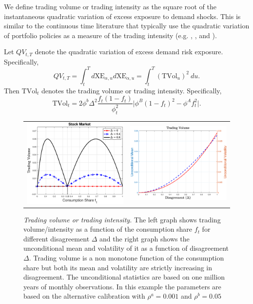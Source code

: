 We define trading volume or trading intensity as the square root of the instantaneous quadratic variation of excess exposure to demand shocks. This is similar to the continuous time literature that typically use the quadratic variation of portfolio policies as a measure of the trading intensity (e.g. , , and ).  

\begin{prop}\label{prop:TradingVolume}
 Let $QV_{t,T}$ denote the quadratic variation of excess demand risk exposure. Specifically,
 \begin{equation}
  QV_{t,T} = \int_t^{T} d\text{XE}_{\alpha,u} d\text{XE}_{\alpha,u} = \int_t^{T} \left(\text{TVol}_u\right)^2 \: du.
 \end{equation}
 Then $\text{TVol}_t$ denotes the trading volume or trading intensity. Specifically, 
\begin{equation}\label{eq:TVol}
	\text{TVol}_t = 2\phi^b \Delta^2  \frac{f_t (1-f_t) }{\phi_t^2} \lvert \phi^B \left(1-f_t\right)^2 - \phi^A f_t^2   \rvert.
\end{equation}
\end{prop}

\begin{figure}[H] 
\centering
\begin{tabular}{cc}
\includegraphics[width=.4\textwidth]{figures/TradingVolume2f.eps} &
\includegraphics[width=.4\textwidth]{figures/TradingVolume2DELmeanvol.eps} 
\end{tabular}
\caption{\emph{Trading volume or trading intensity.} \footnotesize{The left graph shows trading volume/intensity as a function of the consumption share $f_t$ for different disagreement $\Delta$ and the right graph shows the unconditional mean and volatility of it as a function of disagreement $\Delta$. Trading volume is a non monotone function of the consumption share but both its mean and volatility are strictly increasing in disagreement. The unconditional statistics are based on one million years of monthly observations. In this example the parameters are based on the alternative calibration with $\rho^a = 0.001$ and $\rho^b = 0.05$}}   \label{fig:tradingf} 
\end{figure}

